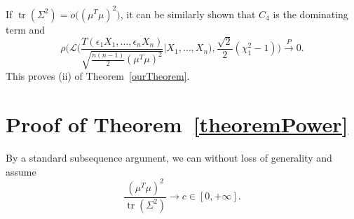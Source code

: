 \documentclass[3p]{elsarticle}
\DeclareMathOperator{\mytr}{tr}
\theoremstyle{plain}
\theoremstyle{definition}
\theoremstyle{remark}
\begin{document}
    If $\mytr(\Sigma^2)=o\big((\mu^T \mu)^2\big)$, it can be similarly shown that $C_4$ is the dominating term and 
    $$
                \rho\Big(\mathcal{L}\Big(\frac{T(\epsilon_1 X_1,\ldots,\epsilon_n X_n)}{\sqrt{\frac{n(n-1)}{2}(\mu^T \mu)^2}}\Big| X_1,\ldots,X_n\Big),\frac{\sqrt{2}}{2}(\chi^2_1-1)\Big)
            \xrightarrow{P} 0.
    $$
    This proves (ii) of Theorem~\ref{ourTheorem}.




\section{Proof of Theorem~\ref{theoremPower}}
By a standard subsequence argument, we can without loss of generality and assume
$$
\frac{(\mu^T \mu)^2}{\mytr(\Sigma^2)}\to c\in [0,+\infty].
$$
\end{document}
